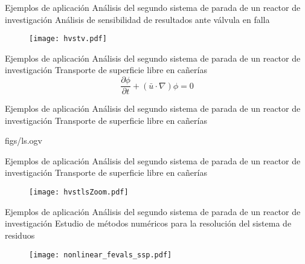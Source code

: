 \begin{frame}
{Ejemplos de aplicación}
{Análisis del segundo sistema de parada de un reactor de investigación}
Análisis de sensibilidad de resultados ante válvula en falla
\begin{figure}
\centering{}
\texttt{[image: hvstv.pdf]}
\end{figure}
\end{frame}

\begin{frame}
{Ejemplos de aplicación}
{Análisis del segundo sistema de parada de un reactor de investigación}
Transporte de superficie libre en cañerías
\begin{equation*}
\frac{\partial\phi}{\partial t}+ (\bar{u} \cdot \nabla) \phi = 0
\label{eq-ls}
\end{equation*}
\end{frame}
\begin{frame}
{Ejemplos de aplicación}
{Análisis del segundo sistema de parada de un reactor de investigación}
Transporte de superficie libre en cañerías
\begin{center}
%
{figs/ls.ogv} %
\end{center}
\end{frame}
\begin{frame}
{Ejemplos de aplicación}
{Análisis del segundo sistema de parada de un reactor de investigación}
Transporte de superficie libre en cañerías
\begin{figure}
\centering{}
\texttt{[image: hvstlsZoom.pdf]}
\end{figure}
\end{frame}





\begin{frame}
{Ejemplos de aplicación}
{Análisis del segundo sistema de parada de un reactor de investigación}
Estudio de métodos numéricos para la resolución del sistema de residuos
\begin{figure}
\centering{}
\texttt{[image: nonlinear\_fevals\_ssp.pdf]}
\end{figure}
\end{frame}







